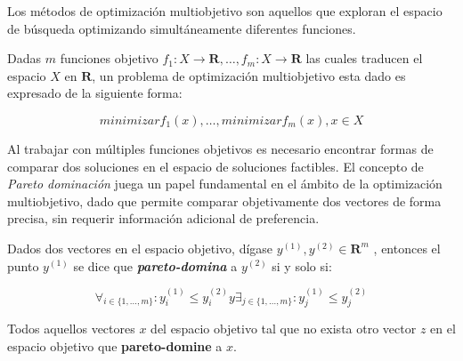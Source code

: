 Los métodos de optimización multiobjetivo son aquellos que exploran el espacio de búsqueda optimizando simultáneamente diferentes funciones.

\begin{definition}
\label{definition:multiobjective}

    Dadas $m$ funciones objetivo $f_1: X \rightarrow \mathbf{R}, \dots, f_m: X \rightarrow \mathbf{R}$ las cuales traducen el espacio $X$ en $\mathbf{R}$, un problema de optimización multiobjetivo esta dado es expresado de la siguiente forma:

    \begin{equation}
        minimizar f_1(x), \dots, minimizar f_m(x), x \in X
    \end{equation}
\end{definition}

Al trabajar con múltiples funciones objetivos es necesario encontrar formas de comparar dos soluciones en el espacio de soluciones factibles.
El concepto de \textit{Pareto dominación} juega un papel fundamental en el ámbito de la optimización multiobjetivo, dado que permite comparar objetivamente dos vectores de forma precisa, sin requerir información adicional de preferencia.

\begin{definition}
\label{definition:pareto-dominance}

    Dados dos vectores en el espacio objetivo, dígase $y^{(1)}, y^{(2)} \in \mathbf{R}^m$ , entonces el punto $y^{(1)}$ se dice que \textbf{\textit{pareto-domina}} a $y^{(2)}$ si y solo si:

    \begin{equation}
        \forall_{i\in\{1,\dots,m\}}: y_i^{(1)} \leq y_i^{(2)} y \exists_{j\in\{1,\dots,m\}}: y_j^{(1)} \le y_j^{(2)}
    \end{equation}
\end{definition}

\begin{definition}
\label{definition:pareto-front}
    Todos aquellos vectores $x$ del espacio objetivo tal que no exista otro vector $z$ en el espacio objetivo que \textbf{pareto-domine} a $x$.
\end{definition}

